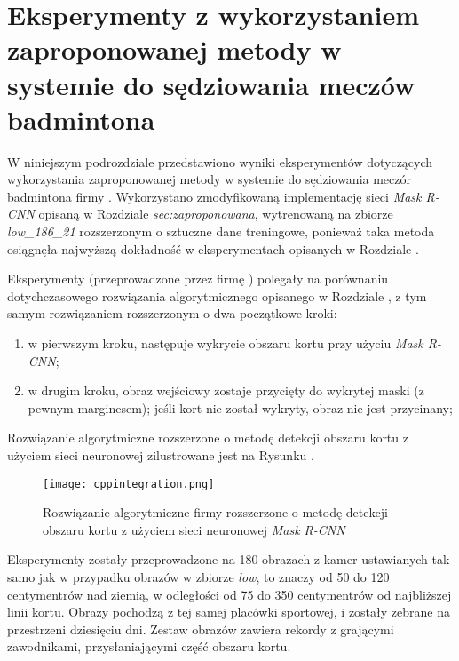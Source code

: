 \section{Eksperymenty z wykorzystaniem zaproponowanej metody w systemie do sędziowania meczów badmintona}
\label{sec:integrationblue}

W niniejszym podrozdziale przedstawiono wyniki eksperymentów dotyczących wykorzystania zaproponowanej metody w systemie do sędziowania meczór badmintona firmy \blue{}.
Wykorzystano zmodyfikowaną implementację sieci \textit{Mask R-CNN} opisaną w Rozdziale \textit{sec:zaproponowana}, wytrenowaną na zbiorze \textit{low\_186\_21} rozszerzonym o sztuczne dane treningowe, ponieważ taka metoda osiągnęła najwyższą dokładność w eksperymentach opisanych w Rozdziale .

Eksperymenty (przeprowadzone przez firmę \blue{}) polegały na porównaniu dotychczasowego rozwiązania algorytmicznego opisanego w Rozdziale , z tym samym rozwiązaniem rozszerzonym o dwa początkowe kroki:

\begin{enumerate}
  \item w pierwszym kroku, następuje wykrycie obszaru kortu przy użyciu \textit{Mask R-CNN};
  \item w drugim kroku, obraz wejściowy zostaje przycięty do wykrytej maski (z pewnym marginesem); jeśli kort nie został wykryty, obraz nie jest przycinany;
\end{enumerate}

Rozwiązanie algorytmiczne rozszerzone o metodę detekcji obszaru kortu z użyciem sieci neuronowej zilustrowane jest na Rysunku .

\begin{figure}[h]
  \centering
  \texttt{[image: cppintegration.png]}
  \caption{Rozwiązanie algorytmiczne firmy \blue{} rozszerzone o metodę detekcji obszaru kortu z użyciem sieci neuronowej \textit{Mask R-CNN}}
  \label{fig:cppintegration}
\end{figure}

Eksperymenty zostały przeprowadzone na 180 obrazach z kamer ustawianych tak samo jak w przypadku obrazów w zbiorze \textit{low}, to znaczy od 50 do 120 centymentrów nad ziemią, w odległości od 75 do 350 centymentrów od najbliższej linii kortu. Obrazy pochodzą z tej samej placówki sportowej, i zostały zebrane na przestrzeni dziesięciu dni. Zestaw obrazów zawiera rekordy z grającymi zawodnikami, przysłaniającymi część obszaru kortu.

